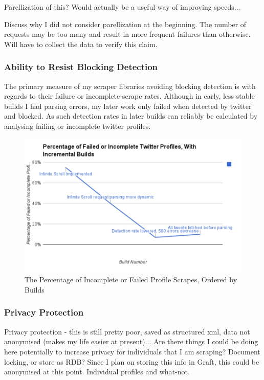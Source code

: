 Parellization of this? Would actually be a useful way of improving speeds...

Discuss why I did not consider parellization at the beginning. The number of requests may be too many and result in more frequent failures than otherwise. Will have to collect the data to verify this claim. 

\subsubsection{Ability to Resist Blocking Detection}

The primary measure of my scraper libraries avoiding blocking detection is with regards to their failure or incomplete-scrape rates. Although in early, less stable builds I had parsing errors, my later work only failed when detected by twitter and blocked. As such detection rates in later builds can reliably be calculated by analysing failing or incomplete twitter profiles. 

\begin{figure}[h!]
\centering
\includegraphics{Images/percentage_failed_incomplete_twitter_profiles.pdf}
\caption{The Percentage of Incomplete or Failed Profile Scrapes, Ordered by Builds}
\end{figure}

\subsubsection{Privacy Protection}

Privacy protection - this is still pretty poor, saved as structured xml, data not anonymised (makes my life easier at present)... Are there things I could be doing here potentially to increase privacy for individuals that I am scraping? Document locking, or store as RDB? Since I plan on storing this info in Graft, this could be anonymised at this point. Individual profiles and what-not. 


